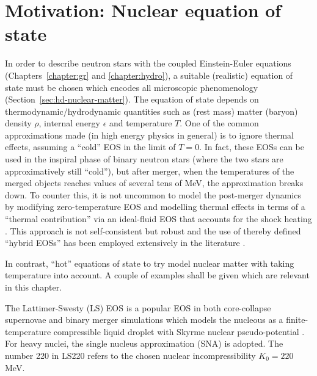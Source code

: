 \section{Motivation: Nuclear equation of state}\label{sec:bnslt-motivation}

In order to describe neutron stars with the coupled Einstein-Euler equations
(Chapters~\ref{chapter:gr} and \ref{chapter:hydro}), a suitable 
(realistic) equation of state must be chosen which encodes all
microscopic phenomenology (Section~\ref{sec:hd-nuclear-matter}).
The equation of state depends on thermodynamic/hydrodynamic quantities
such as (rest mass) matter (baryon) density $\rho$, internal energy $\epsilon$
and temperature $T$. One of the common approximations made (in high energy
physics in general) is to ignore thermal effects, assuming a ``cold'' EOS in the
limit of $T=0$. In fact, these EOSs can be used in the inspiral phase of binary
neutron stars (where the two stars are approximatively still ``cold''),
but after merger, when the temperatures of the merged objects reaches values
of several tens of MeV, the approximation breaks down. To
counter this, it is not uncommon \cite{Bauswein2011,Takami2014} to model
the post-merger dynamics by modifying zero-temperature EOS and modelling thermal
effects in terms of a ``thermal contribution'' via an ideal-fluid EOS
\cite{Rezzolla_book:2013} that accounts for the shock heating
\cite{Janka93}. This approach is not self-consistent but robust and the
use of thereby defined ``hybrid EOSs'' has been employed
extensively in the literature \cite{Baiotti2016}.

In contrast, ``hot'' equations of state to try model nuclear matter
with taking temperature into account. A couple of examples shall be given which
are relevant in this chapter.

The Lattimer-Swesty (LS) EOS \citep{Lalazissis1996} is a popular EOS in both
core-collapse supernovae and binary merger simulations which models 
the nucleous as a finite-temperature
compressible liquid droplet with Skyrme nuclear pseudo-potential
\citep{Lattimer91,Lattimer85}. For heavy nuclei, the single nucleus 
approximation (SNA)
is adopted. The number 220 in LS220 refers to the chosen nuclear
incompressibility $K_0=220$MeV.

